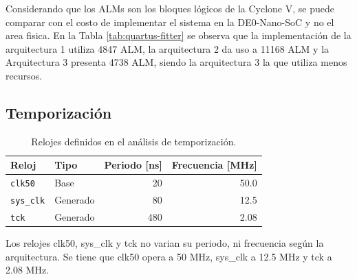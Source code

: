 \begin{table}[H]
  \centering
  \caption{Utilización de recursos de la Cyclone V para el FIR en cada arquitectura.}
  \label{tab:quartus-fitter}
\end{table}

Considerando que los ALMs son los bloques lógicos de la Cyclone V, se puede comparar con el costo de implementar el sistema en la DE0-Nano-SoC y no el area fisica. En la Tabla \ref{tab:quartus-fitter} se observa que la implementación de la arquitectura 1 utiliza 4847 ALM, la arquitectura 2 da uso a 11168 ALM y la Arquitectura 3 presenta 4738 ALM, siendo la arquitectura 3 la que utiliza menos recursos.

\subsection{Temporización}

\begin{table}[H]
  \centering
  \caption{Relojes definidos en el análisis de temporización.}
  \label{tab:quartus-relojes}
  \begin{tabular}{llrr}
    \toprule
    Reloj & Tipo & Periodo [ns] & Frecuencia [MHz] \\
    \midrule
    \texttt{clk50}   & Base      & 20  & 50.0 \\
    \texttt{sys\_clk} & Generado & 80  & 12.5 \\
    \texttt{tck}     & Generado  & 480 & 2.08 \\
    \bottomrule
  \end{tabular}
\end{table}

Los relojes clk50, sys\_clk y tck no varian su periodo, ni frecuencia según la arquitectura. Se tiene que clk50 opera a 50 MHz, sys\_clk a 12.5 MHz y tck a 2.08 MHz.


